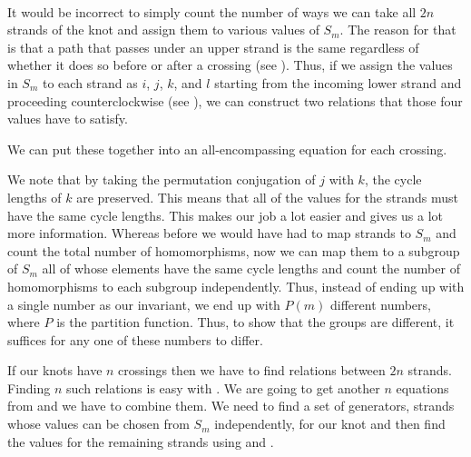 \begin{paper}
\vspace{-5em}\hfill{}\\


It would be incorrect to simply count the number of ways we can take all $2n$
strands of the knot and assign them to various values of $S_m$.
The reason for that is that a path that passes under an upper strand is the same
regardless of whether it does so before or after a crossing (see \figPasses).
Thus, if we assign the values in $S_m$ to each strand as $i$, $j$, $k$, and $l$
starting from the incoming lower strand and proceeding counterclockwise (see
\figX), we can construct two relations that those four values have to
satisfy.


We can put these together into an all-encompassing equation for each crossing.


We note that by taking the permutation conjugation of $j$ with $k$, the cycle
lengths of $k$ are preserved.
This means that all of the values for the strands must have the same cycle
lengths.
This makes our job a lot easier and gives us a lot more information.
Whereas before we would have had to map strands to $S_m$ and count the total
number of homomorphisms, now we can map them to a subgroup of $S_m$ all of whose
elements have the same cycle lengths and count the number of homomorphisms to
each subgroup independently.
Thus, instead of ending up with a single number as our invariant, we end up with
$P(m)$ different numbers, where $P$ is the partition function.
Thus, to show that the groups are different, it suffices for any one of these
numbers to differ.

If our knots have $n$ crossings then we have to find relations between $2n$ strands.
Finding $n$ such relations is easy with \eqUpper.
We are going to get another $n$ equations from \eqBoth and we have to combine them.
We need to find a set of generators, strands whose values can be chosen from
$S_m$ independently, for our knot and then find the values for the remaining
strands using \eqUpper and \eqBoth.


\end{paper}
